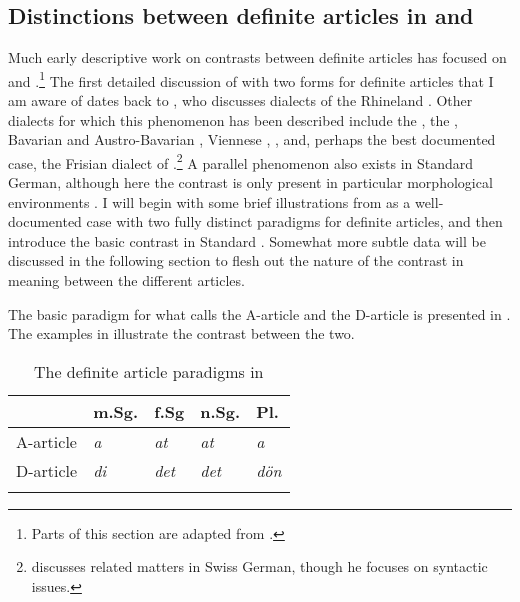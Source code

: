 \documentclass[output=paper
,modfonts
,nonflat]{langscibook}
\begin{document}
\subsection{Distinctions between definite
  articles in  and }

Much early descriptive work on contrasts between definite articles has
focused on  and .\footnote{Parts of this section are adapted from \citet{Schwarz2013}.} The first
detailed discussion of  with two forms for definite articles that I am aware of dates back to
\citet{Heinrichs1954}, who discusses dialects of the Rhineland
\citep[see also][]{Hartmann1967}. Other dialects for which this
phenomenon has been described include 
the 
\citep{Hartmann1982}, 
the  \citep{Himmelmann1997},
Bavarian \citep{Scheutz1988,Schwager2007} 
and Austro-Bavarian \citep{BruggerPrinzhorn1996,Wiltschko2013},
Viennese \citep{SchusterSchikola1984},
 \citep{Schmitt2006},
and, perhaps the best
documented case, the Frisian dialect of 
\citep{Ebert1971,Ebert1971b}.\footnote{\citet{Leu2008} discusses
  related matters in Swiss German, though he focuses
  on syntactic issues.}  A parallel phenomenon also exists in
Standard German, although here the contrast is only present in
particular morphological environments
\citep{Hartmann1978,Hartmann1980,Haberland1985,Cieschinger2006,Waldmuller2008,Schwarz2009}. I
will begin with some brief illustrations from  as a
well-documented case with two fully distinct paradigms for definite
articles, and then introduce the basic contrast in Standard
. Somewhat more subtle  data will be discussed in the
following section to flesh out the nature of the contrast in meaning
between the different articles.

The basic paradigm for what \citet{Ebert1971b} calls the A-article and
the D-article is presented in . The
examples in  illustrate the contrast between the two.

\begin{table}[h]
	\begin{tabularx}{.5\textwidth}{lXXXX} 
		\lsptoprule
		& {m.Sg.} & {f.Sg} & {n.Sg.} & {Pl}.\\
		\midrule
		{A-article} & \textit{a} & \textit{at} & \textit{at} & \textit{a}\\
		{D-article} & \textit{di} & \textit{det} & \textit{det} & \textit{d\"on}\\
		\lspbottomrule
	\end{tabularx}
	\caption{The definite article paradigms in  \citep[159]{Ebert1971b}}
	\label{tab:schwarz:1}
\end{table}
\end{document}
